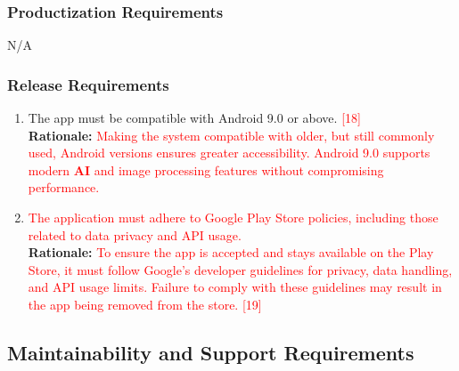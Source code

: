 \documentclass{article}
\begin{document}
\subsubsection{Productization Requirements}
\label{ssub:productization_requirements}
\hspace{1.5cm}     N/A 

\subsubsection{Release Requirements}
\label{ssub:release_requirements}
\begin{enumerate}[{OE-R}1. ]
	\item The app must be compatible with Android 9.0 or above. \textcolor{red}{[18]}\\
	\textbf{Rationale:} \textcolor{red}{Making the system compatible with older, but still commonly used, Android versions ensures greater accessibility. Android 9.0 supports modern \textbf{AI} and image processing features without compromising performance.}\\
	\item \textcolor{red}{The application must adhere to Google Play Store policies, including those related to data privacy and API usage.}\\
	\textbf{Rationale:} \textcolor{red}{To ensure the app is accepted and stays available on the Play Store, it must follow Google’s developer guidelines for privacy, data handling, and API usage limits. Failure to comply with these guidelines may result in the app being removed from the store. [19]}\\
\end{enumerate}


\subsection{Maintainability and Support Requirements}
\label{sub:maintainability_and_support_requirements}
\end{document}
